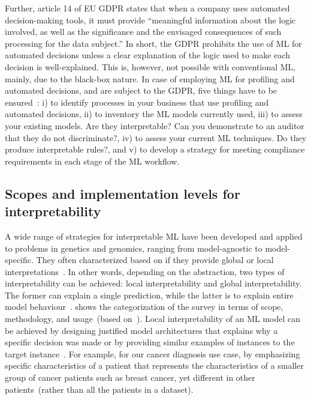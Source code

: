 \hspace*{3.5mm} Further, article 14 of EU GDPR states that when a company uses automated decision-making tools, it must provide ``meaningful information about the logic involved, as well as the significance and the envisaged consequences of such processing for the data subject.” In short, the GDPR prohibits the use of ML for automated decisions unless a clear explanation of the logic used to make each decision is well-explained. This is, however, not possible with conventional ML, mainly, due to the black-box nature. In case of employing ML for profiling and automated decisions, and are subject to the GDPR, five things have to be ensured~\cite{doshi2017towards}: i) to identify processes in your business that use profiling and automated decisions, ii) to inventory the ML models currently used, iii) to assess your existing models. Are they interpretable? Can you demonstrate to an auditor that they do not discriminate?, iv) to assess your current ML techniques. Do they produce interpretable rules?, and v) to develop a strategy for meeting compliance requirements in each stage of the ML workflow. \\

\subsection{Scopes and implementation levels for interpretability}
A wide range of strategies for interpretable ML have been developed and applied to problems in genetics and genomics, ranging from model-agnostic to model-specific. They often characterized based on if they provide global or local interpretations~\cite{azodi2020opening}. In other words, depending on the abstraction, two types of interpretability can be achieved: local interpretability and global interpretability. The former can explain a single prediction, while the latter is to explain entire model behaviour~\cite{molnar2019interpretable}.  shows the categorization of the survey in terms of scope, methodology, and usage~(based on~\cite{das2020opportunities}). 
Local interpretability of an ML model can be achieved by designing justified model architectures that explains why a specific decision was made or by providing similar examples of instances to the target instance~\cite{stiglic2020interpretability}. For example, for our cancer diagnosis use case, by emphasizing specific characteristics of a patient that represents the characteristics of a smaller group of cancer patients such as breast cancer, yet different in other patients~(rather than all the patients in a dataset).


